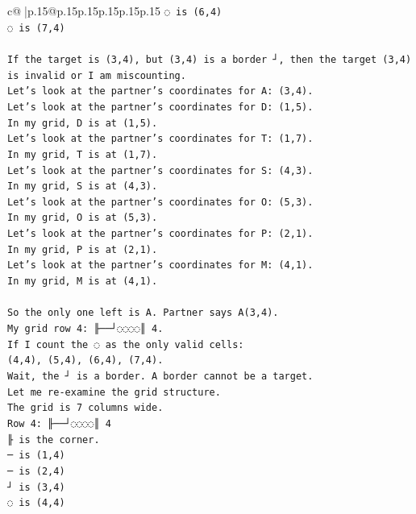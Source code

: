 \documentclass{article}
\begin{document}
{\begin{supertabular}{c@{$\;$}|p{.15\linewidth}@{}p{.15\linewidth}p{.15\linewidth}p{.15\linewidth}p{.15\linewidth}p{.15\linewidth}}
{{{\texttt{◌ is (6,4)} \\
\texttt{◌ is (7,4)} \\
\\ 
\texttt{If the target is (3,4), but (3,4) is a border ┘, then the target (3,4) is invalid or I am miscounting.} \\
\texttt{Let's look at the partner's coordinates for A: (3,4).} \\
\texttt{Let's look at the partner's coordinates for D: (1,5).} \\
\texttt{In my grid, D is at (1,5).} \\
\texttt{Let's look at the partner's coordinates for T: (1,7).} \\
\texttt{In my grid, T is at (1,7).} \\
\texttt{Let's look at the partner's coordinates for S: (4,3).} \\
\texttt{In my grid, S is at (4,3).} \\
\texttt{Let's look at the partner's coordinates for O: (5,3).} \\
\texttt{In my grid, O is at (5,3).} \\
\texttt{Let's look at the partner's coordinates for P: (2,1).} \\
\texttt{In my grid, P is at (2,1).} \\
\texttt{Let's look at the partner's coordinates for M: (4,1).} \\
\texttt{In my grid, M is at (4,1).} \\
\\ 
\texttt{So the only one left is A. Partner says A(3,4).} \\
\texttt{My grid row 4: ╟──┘◌◌◌◌║ 4.} \\
\texttt{If I count the ◌ as the only valid cells:} \\
\texttt{(4,4), (5,4), (6,4), (7,4).} \\
\texttt{Wait, the ┘ is a border. A border cannot be a target.} \\
\texttt{Let me re{-}examine the grid structure.} \\
\texttt{The grid is 7 columns wide.} \\
\texttt{Row 4: ╟──┘◌◌◌◌║ 4} \\
\texttt{╟ is the corner.} \\
\texttt{─ is (1,4)} \\
\texttt{─ is (2,4)} \\
\texttt{┘ is (3,4)} \\
\texttt{◌ is (4,4)} \\
}}}
\end{supertabular}}
\end{document}
